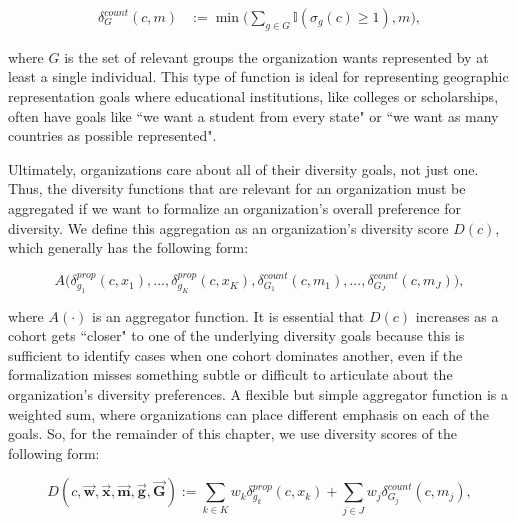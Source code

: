 \begin{equation} 
    \begin{split}
        \delta_G^{count}(c,m) &:= \min\big(\sum_{g \in G}\mathbb{I}(\sigma_g(c)\geq 1), m\big), \label{eq:count_div_function}
    \end{split}
\end{equation}

\noindent where $G$ is the set of relevant groups the organization wants represented by at least a single individual. This type of function is ideal for representing geographic representation goals where educational institutions, like colleges or scholarships, often have goals like ``we want a student from every state" or ``we want as many countries as possible represented". 

Ultimately, organizations care about all of their diversity goals, not just one. Thus, the diversity functions that are relevant for an organization must be aggregated if we want to formalize an organization's overall preference for diversity. We define this aggregation as an organization's diversity score $D(c)$, which generally has the following form: 

\begin{equation}
A\big(\delta_{g_1}^{prop}(c,x_1),...,\delta_{g_K}^{prop}(c,x_K),\delta_{G_1}^{count}(c, m_1),...,\delta_{G_J}^{count}(c, m_J)\big), \nonumber
\end{equation}

\noindent where $A(\cdot)$ is an aggregator function. It is essential that $D(c)$ increases as a cohort gets ``closer" to one of the underlying diversity goals because this is sufficient to identify cases when one cohort dominates another, even if the formalization misses something subtle or difficult to articulate about the organization's diversity preferences. A flexible but simple aggregator function is a weighted sum, where organizations can place different emphasis on each of the goals. So, for the remainder of this chapter, we use diversity scores of the following form: 

\begin{equation}\label{eq:d_equation}
D(c,\vec{\mathbf{w}},\vec{\mathbf{x}},\vec{\mathbf{m}}, \vec{\mathbf{g}}, \vec{\mathbf{G}}) := \sum_{k\in K}w_k\delta_{g_k}^{prop}(c,x_k) + \sum_{j \in J}w_j\delta_{G_j}^{count}(c, m_j),
\end{equation}

